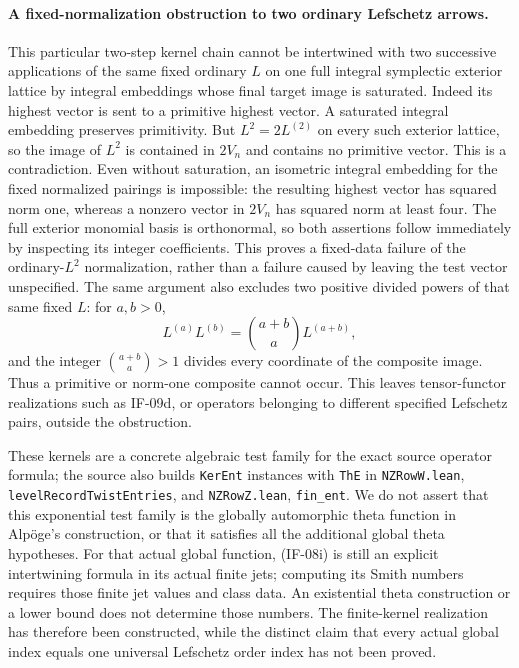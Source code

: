 \paragraph{A fixed-normalization obstruction to two ordinary Lefschetz arrows.}
This particular two-step kernel chain cannot be intertwined with two
successive applications of the same fixed ordinary $L$ on one full
integral symplectic exterior lattice by integral embeddings whose
final target image is saturated. Indeed its highest vector is
sent to a primitive highest vector. A saturated integral embedding
preserves primitivity. But $L^2=2L^{(2)}$ on every such exterior
lattice, so the image of $L^2$ is contained in $2V_n$ and contains no
primitive vector. This is a contradiction. Even without saturation,
an isometric integral embedding for the fixed normalized pairings is
impossible: the resulting highest vector has squared norm one, whereas
a nonzero vector in $2V_n$ has squared norm at least four. The full
exterior monomial basis is orthonormal, so both assertions follow
immediately by inspecting its integer coefficients. This proves a
fixed-data failure of the ordinary-$L^2$ normalization, rather than a
failure caused by leaving the test vector unspecified. The same argument
also excludes two positive divided powers of that same fixed $L$:
for $a,b>0$,
\[
 L^{(a)}L^{(b)}=\binom{a+b}{a}L^{(a+b)},
\]
and the integer $\binom{a+b}{a}>1$ divides every coordinate of the
composite image. Thus a primitive or norm-one composite cannot occur.
This leaves tensor-functor realizations such as IF-09d, or operators
belonging to different specified Lefschetz pairs, outside the
obstruction.

These kernels are a concrete algebraic test family for the exact
source operator formula; the source also builds \texttt{KerEnt}
instances with \texttt{ThE} in \texttt{NZRowW.lean},
\texttt{levelRecordTwistEntries}, and \texttt{NZRowZ.lean},
\texttt{fin\_ent}. We do not assert that this exponential test family
is the globally automorphic theta function in Alp\"oge's construction,
or that it satisfies all the additional global theta hypotheses.
For that actual global function, (IF-08i) is still an explicit
intertwining formula in its actual finite jets; computing its Smith
numbers requires those finite jet values and class data. An
existential theta construction or a lower bound does not determine
those numbers. The finite-kernel realization has therefore been
constructed, while the distinct claim that every actual global index
equals one universal Lefschetz order index has not been proved.

